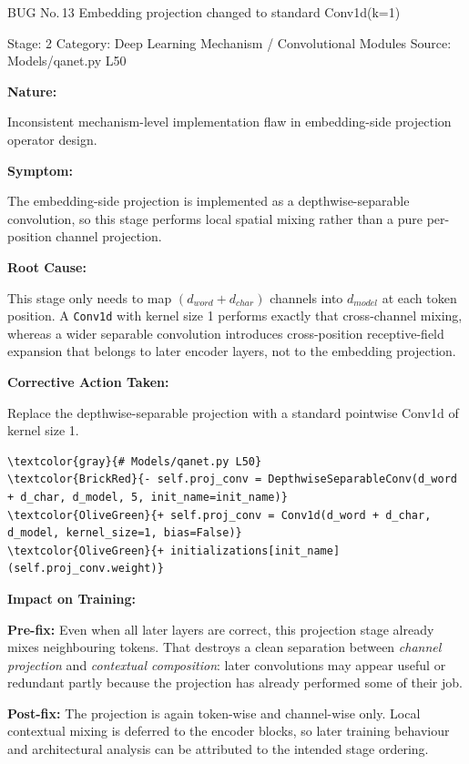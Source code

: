 \documentclass[10pt]{article}
\newcommand{\FieldLabel}[1]{%
 {\bfseries #1:}\par
}
\begin{document}
\begin{bugbox}{BUG No.\,13 \quad Embedding projection changed to standard Conv1d(k=1)}
{\color{MetaGray}\small Stage: 2 \;\textbar\; Category: Deep Learning Mechanism / Convolutional Modules \;\textbar\; Source: Models/qanet.py L50\par}
\vspace{0.22em}
\FieldLabel{Nature}
Inconsistent mechanism-level implementation flaw in embedding-side projection operator design.
\par
\vspace{0.35em}
\FieldLabel{Symptom}
The embedding-side projection is implemented as a depthwise-separable convolution, so this stage performs local spatial mixing rather than a pure per-position channel projection.
\par
\vspace{0.35em}
\FieldLabel{Root Cause}
This stage only needs to map $(d_{word}+d_{char})$ channels into $d_{model}$ at each token position. A \texttt{Conv1d} with kernel size 1 performs exactly that cross-channel mixing, whereas a wider separable convolution introduces cross-position receptive-field expansion that belongs to later encoder layers, not to the embedding projection.
\par
\vspace{0.35em}
\FieldLabel{Corrective Action Taken}
Replace the depthwise-separable projection with a standard pointwise Conv1d of kernel size 1.
\par
\vspace{0.35em}
\begin{Verbatim}[commandchars=\\\{\},fontsize=\footnotesize,breaklines=true,breaksymbol={},frame=leftline,framerule=2pt,rulecolor=\color{gray!40},xleftmargin=6pt,formatcom=\singlespacing]
\textcolor{gray}{# Models/qanet.py L50}
\textcolor{BrickRed}{- self.proj_conv = DepthwiseSeparableConv(d_word + d_char, d_model, 5, init_name=init_name)}
\textcolor{OliveGreen}{+ self.proj_conv = Conv1d(d_word + d_char, d_model, kernel_size=1, bias=False)}
\textcolor{OliveGreen}{+ initializations[init_name](self.proj_conv.weight)}
\end{Verbatim}
\vspace{0.22em}
\FieldLabel{Impact on Training}
\textbf{Pre-fix:} Even when all later layers are correct, this projection stage already mixes neighbouring tokens. That destroys a clean separation between \emph{channel projection} and \emph{contextual composition}: later convolutions may appear useful or redundant partly because the projection has already performed some of their job.\par\smallskip
\textbf{Post-fix:} The projection is again token-wise and channel-wise only. Local contextual mixing is deferred to the encoder blocks, so later training behaviour and architectural analysis can be attributed to the intended stage ordering.
\par
\vspace{0.35em}
\end{bugbox}
\end{document}
